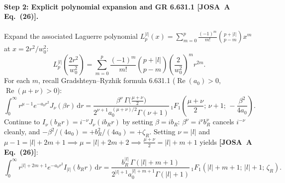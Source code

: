 \documentclass[10pt,letterpaper]{article}
\newcommand{\abs}[1]{\lvert #1 \rvert}
\newcommand{\dd}{\mathrm{d}}
\newcommand{\josa}[1]{\textbf{[JOSA~A Eq.~(#1)]}}
\numberwithin{equation}{section}
\begin{document}
\paragraph*{Step 2: Explicit polynomial expansion and GR 6.631.1 \josa{26}.}
Expand the associated Laguerre polynomial $L_p^{\abs{l}}(x) = \sum_{m=0}^p \frac{(-1)^m}{m!}\binom{p+\abs{l}}{p-m} x^m$ at $x = 2r^2/w_0^2$:
\begin{equation}
  L_p^{\abs{l}}\!\left(\frac{2r^2}{w_0^2}\right) = \sum_{m=0}^p \frac{(-1)^m}{m!}\binom{p+\abs{l}}{p-m}\left(\frac{2}{w_0^2}\right)^m r^{2m}.
\end{equation}
For each $m$, recall Gradshteyn--Ryzhik formula 6.631.1 ($\operatorname{Re}(a_0)>0$, $\operatorname{Re}(\mu+\nu)>0$):
\begin{equation}
  \int_0^\infty r^{\mu-1} e^{-a_0 r^2} J_\nu(\beta r)\,\dd r = \frac{\beta^\nu\,\Gamma\bigl(\frac{\mu+\nu}{2}\bigr)}{2^{\nu+1} a_0^{(\mu+\nu)/2}\Gamma(\nu+1)}\,{}_1F_1\!\left(\frac{\mu+\nu}{2};\,\nu+1;\,-\frac{\beta^2}{4a_0}\right).
\end{equation}
Continue to $I_\nu(b_R r) = i^{-\nu} J_\nu(i b_R r)$ by setting $\beta = i b_R$: $\beta^\nu = i^\nu b_R^\nu$ cancels $i^{-\nu}$ cleanly, and $-\beta^2/(4a_0) = +b_R^2/(4a_0) = +\zeta_R$. Setting $\nu = \abs{l}$ and $\mu - 1 = \abs{l} + 2m + 1 \implies \mu = \abs{l} + 2m + 2 \implies \frac{\mu+\nu}{2} = \abs{l} + m + 1$ yields \josa{26}:
\begin{equation}
  \int_0^\infty r^{\abs{l}+2m+1} e^{-a_0 r^2} I_{\abs{l}}(b_R r)\,\dd r = \frac{b_R^{\abs{l}}\,\Gamma(\abs{l}+m+1)}{2^{\abs{l}+1} a_0^{\abs{l}+m+1}\Gamma(\abs{l}+1)}\,{}_1F_1(\abs{l}+m+1;\,\abs{l}+1;\,\zeta_R).
\end{equation}
\end{document}
